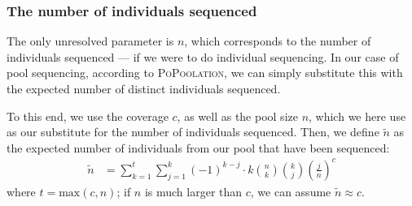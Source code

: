 \documentclass[letterpaper,fontsize=9pt,DIV=12]{scrartcl}
\newcounter{todo}
\newcounter{popoolissue}
\newcommand\todo[1]{}
\newcommand\popoolissue[1]{}
\newcommand\toolname{\textsc}
\newcommand{\coverage}{c}
\begin{document}
\popoolissue{Another small issue: The computation of alpha* requires ``effective coverage'' to be larger than 1, see \href{https://github.com/lczech/popoolation/blob/092e7a6f7ee4910c1bec4377e0adccc353175bc8/Modules/VarMath.pm\#L226}{here}, but tests this against $n$, which is the number of individuals. Are we missing something here?}

\popoolissue{Furthermore, we tested the computation of alpha*, and it also gives NaN values for input 2 and 3, so the test should in fact be $>= 4$ instead.}


\subsubsection*{The number of individuals sequenced}

The only unresolved parameter is $n$, which corresponds to the number of individuals sequenced ---
if we were to do individual sequencing.
In our case of pool sequencing, according to \toolname{PoPoolation},
we can simply substitute this with the expected number of distinct individuals sequenced.

To this end, we use the coverage $\coverage$, as well as the pool size $n$, which we here use as our substitute for the number of individuals sequenced.
Then, we define $\tilde{n}$ as the expected number of individuals from our pool that have been sequenced:
%
\begin{align}
    \label{eq:IndivSeqBruteForce}
    \tilde{n}
    &= \sum_{k=1}^{t} \sum_{j=1}^{k} (-1)^{k-j} \cdot k \binom{n}{k} \binom{k}{j} \left(\frac{j}{n}\right)^\coverage
\end{align}
%
where $t=\text{max}(\coverage, n)$; if $n$ is much larger than $\coverage$, we can assume $\tilde{n} \approx \coverage$.
\end{document}

